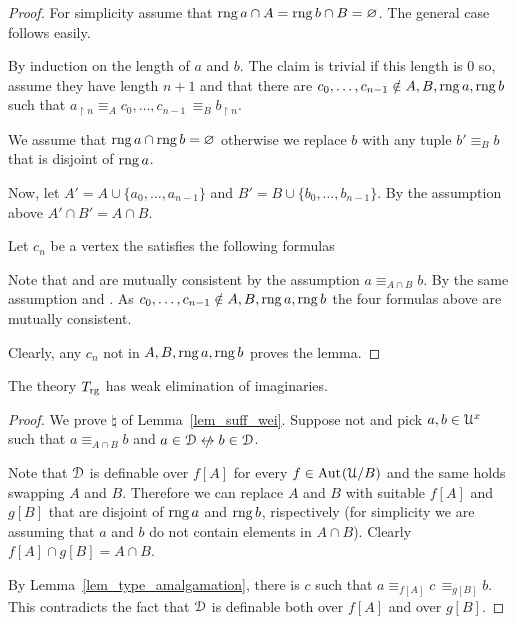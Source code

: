 \begin{proof}
  For simplicity assume that $\mathop{\rm rng} a\cap A=\mathop{\rm rng} b\cap B=\varnothing$.
  The general case follows easily.

  By induction on the length of $a$ and $b$. 
  The claim is trivial if this length is $0$ so, assume they have length $n+1$ and that there are $c_0,\dots,c_{n-1}\notin A, B,\mathop{\rm rng} a,\mathop{\rm rng} b$ such that $a_{\restriction n}\equiv_A c_0,\dots,c_{n-1}\,\equiv_B b_{\restriction n}$.

  We assume that $\mathop{\rm rng} a\cap\mathop{\rm rng} b=\varnothing$ otherwise we replace $b$ with any tuple $b'\equiv_Bb$ that is disjoint of $\mathop{\rm rng} a$.

  Now, let $A'=A\cup\{a_0,\dots,a_{n-1}\}$ and $B'=B\cup\{b_0,\dots,b_{n-1}\}$.
  By the assumption above $A'\cap B'=A\cap B$.

  Let $c_n$ be a vertex the satisfies the following formulas





  Note that  and  are mutually consistent by the assumption $a\equiv_{A\cap B}b$.
  By the same assumption  and .
  As $c_0,\dots,c_{n-1}\notin A, B,\mathop{\rm rng} a,\mathop{\rm rng} b$ the four formulas above are mutually consistent.

  Clearly, any $c_n$ not in $A, B,\mathop{\rm rng} a,\mathop{\rm rng} b$ proves the lemma.
\end{proof}


\begin{lemma}
  The theory $T_{\rm rg}$ has weak elimination of imaginaries.
\end{lemma}

\begin{proof}
  We prove ${\natural}$ of Lemma~\ref{lem_suff_wei}.
  Suppose not and pick $a,b\in\EuScript U^{x}$ such that $a\equiv_{A\cap B}b$ and $a\in\D\niff b\in\D$.

  Note that $\EuScript D$ is definable over $f[A]$ for every $f\in{\rm Aut\kern.15ex}(\EuScript U/B)$ and the same holds swapping $A$ and $B$.
  Therefore we can replace $A$ and $B$ with suitable $f[A]$ and $g[B]$ that are disjoint of $\mathop{\rm rng} a$ and $\mathop{\rm rng} b$, rispectively (for simplicity we are assuming that $a$ and $b$ do not contain elements in $A\cap B$).
  Clearly $f[A]\cap g[B]=A\cap B$.

  By Lemma~\ref{lem_type_amalgamation}, there is $c$ such that $a\equiv_{f[A]} c\,\equiv_{g[B]} b$.
  This contradicts the fact that $\EuScript D$ is definable both over $f[A]$ and over $g[B]$.
\end{proof}


